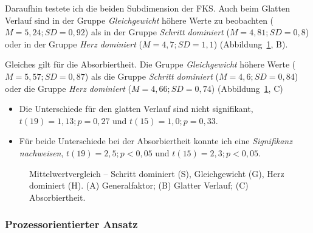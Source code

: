 Daraufhin testete ich die beiden Subdimension der \ac{FKS}. Auch beim Glatten Verlauf sind in der Gruppe \emph{Gleichgewicht} höhere Werte zu beobachten ($M = 5{,}24; SD = 0{,}92$) als in der Gruppe \emph{Schritt dominiert} ($M = 4{,}81; SD = 0{,}8$) oder in der Gruppe \emph{Herz dominiert} ($M = 4{,}7; SD = 1{,}1$) (Abbildung~\ref{fig:mittelwert_vergleich}, B). 

Gleiches gilt für die Absorbiertheit. Die Gruppe \emph{Gleichgewicht} höhere Werte ($M = 5{,}57; SD = 0{,}87$) als die Gruppe \emph{Schritt dominiert} ($M = 4{,}6; SD = 0{,}84$) oder die Gruppe \emph{Herz dominiert} ($M = 4{,}66; SD = 0{,}74$) (Abbildung~\ref{fig:mittelwert_vergleich}, C)
\begin{itemize}
	
	\item Die Unterschiede für den glatten Verlauf sind nicht signifikant, $t(19) = 1{,}13; p = 0{,}27$ und $t(15) = 1{,}0; p = 0{,}33$.
	
	\item Für beide Unterschiede bei der Absorbiertheit konnte ich eine \emph{Signifikanz nachweisen}, $t(19) = 2{,}5; p < 0{,}05$ und $t(15) = 2{,}3; p < 0{,}05$.
\end{itemize}
\begin{figure}
	[thb!]  \caption[Mittelwertvergleich -- Schritt dominiert, Gleichgewicht, Herz dominiert.]{Mittelwertvergleich -- Schritt dominiert (S), Gleichgewicht (G), Herz dominiert (H). (A) Generalfaktor; (B) Glatter Verlauf; (C) Absorbiertheit.} \label{fig:mittelwert_vergleich} 
\end{figure}

\subsubsection{Prozessorientierter Ansatz} 

\label{ssub:prozessorientierter_ansatz_5_3}

